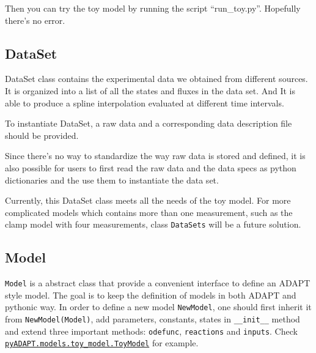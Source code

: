 Then you can try the toy model by running the script ``run\_toy.py''.
Hopefully there's no error.

\hypertarget{dataset}{%
\subsection{DataSet}\label{dataset}}

DataSet class contains the experimental data we obtained from different
sources. It is organized into a list of all the states and fluxes in the
data set. And It is able to produce a spline interpolation evaluated at
different time intervals.

To instantiate DataSet, a raw data and a corresponding data description
file should be provided.

\begin{Shaded}
\begin{Highlighting}[]
\OperatorTok{=}\OperatorTok{=}\NormalTok{,}
\OperatorTok{=}\NormalTok{)}
\end{Highlighting}
\end{Shaded}

Since there's no way to standardize the way raw data is stored and
defined, it is also possible for users to first read the raw data and
the data specs as python dictionaries and the use them to instantiate
the data set.

Currently, this DataSet class meets all the needs of the toy model. For
more complicated models which contains more than one measurement, such
as the clamp model with four measurements, class \texttt{DataSets} will
be a future solution.

\hypertarget{model}{%
\subsection{Model}\label{model}}

\texttt{Model} is a abstract class that provide a convenient interface
to define an ADAPT style model. The goal is to keep the definition of
models in both ADAPT and pythonic way. In order to define a new model
\texttt{NewModel}, one should first inherit it from
\texttt{NewModel(Model)}, add parameters, constants, states in
\texttt{\_\_init\_\_} method and extend three important methods:
\texttt{odefunc}, \texttt{reactions} and \texttt{inputs}. Check
\href{../pyADAPT/models/toy_model.py}{\texttt{pyADAPT.models.toy\_model.ToyModel}}
for example.

